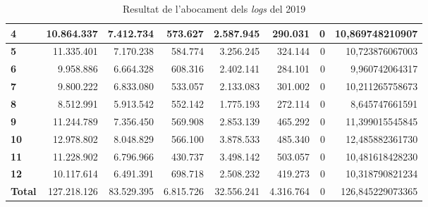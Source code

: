 \begin{table}[h!]
\begin{adjustbox}{width=1.2\textwidth, center}
\begin{tabular}{|l|r|r|r|r|r|r|r|}
            \textbf{4}     & 10.864.337  & 7.412.734  & 573.627   & 2.587.945  & 290.031   & 0 & 10,869748210907  \\
            \midrule
            \textbf{5}     & 11.335.401  & 7.170.238  & 584.774   & 3.256.245  & 324.144   & 0 & 10,723876067003  \\
            \textbf{6}     & 9.958.886   & 6.664.328  & 608.316   & 2.402.141  & 284.101   & 0 & 9,960742064317   \\
            \textbf{7}     & 9.800.222   & 6.833.080  & 533.057   & 2.133.083  & 301.002   & 0 & 10,211265758673  \\
            \textbf{8}     & 8.512.991   & 5.913.542  & 552.142   & 1.775.193  & 272.114   & 0 & 8,645747661591   \\
            \midrule
            \textbf{9}     & 11.244.789  & 7.356.450  & 569.908   & 2.853.139  & 465.292   & 0 & 11,399015545845  \\
            \textbf{10}    & 12.978.802  & 8.048.829  & 566.100   & 3.878.533  & 485.340   & 0 & 12,485882361730  \\
            \textbf{11}    & 11.228.902  & 6.796.966  & 430.737   & 3.498.142  & 503.057   & 0 & 10,481618428230  \\
            \textbf{12}    & 10.117.614  & 6.491.391  & 698.718   & 2.508.232  & 419.273   & 0 & 10,318790821234  \\
            \midrule
            \textbf{Total} & 127.218.126 & 83.529.395 & 6.815.726 & 32.556.241 & 4.316.764 & 0 & 126,845229073365 \\
            \bottomrule
        \end{tabular}
    \end{adjustbox}
    \caption{Resultat de l'abocament dels \textit{logs} del 2019}
    \label{tab:logs-table-2019}
\end{table}

